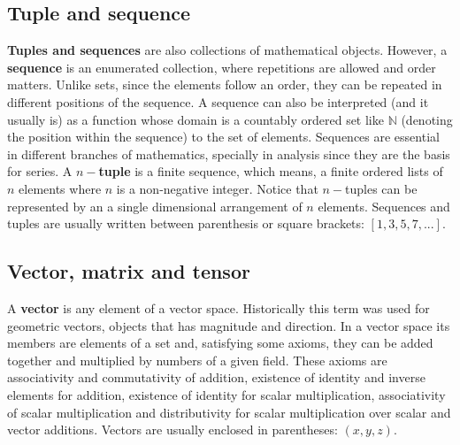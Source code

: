         \subsection*{Tuple and sequence}
        \vspace{-.5cm}
\textbf{Tuples and sequences} are also collections of mathematical objects.
However, a \textbf{sequence} is an enumerated collection, where repetitions are allowed and order matters.
Unlike sets, since the elements follow an order, they can be repeated in different positions of the sequence.
A sequence can also be interpreted (and it usually is) as a function whose domain is a countably ordered set like $\mathbb{N}$ 
(denoting the position within the sequence) to the set of elements. 
Sequences are essential in different branches of mathematics, specially in analysis since they are 
the basis for series.
A $n-$\textbf{tuple} is a finite sequence, which means, a finite ordered lists of $n$ elements where $n$ is a non-negative integer.
Notice that $n-$tuples can be represented by an a single dimensional arrangement of $n$ elements.
Sequences and tuples are usually written between parenthesis or square brackets: $[1,3,5,7,...]$.


        \subsection*{Vector, matrix and tensor}
        \vspace{-.5cm}
A \textbf{vector} is any element of a vector space.
Historically this term was used for geometric vectors, objects that has magnitude and direction.
In a vector space its members are elements of a set and, satisfying some axioms, they can be added together and multiplied by numbers of a given field. 
These axioms are associativity and commutativity of addition, 
existence of identity and inverse elements for addition, 
existence of identity for scalar multiplication, 
associativity of scalar multiplication and 
distributivity for scalar multiplication over scalar and vector additions. 
Vectors are usually enclosed in parentheses: $(x,y,z)$.

